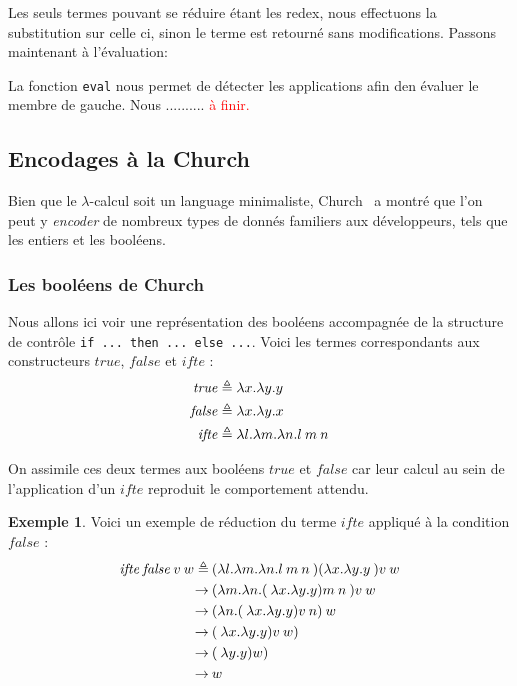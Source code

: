 \documentclass {article}
\newcommand{\codefrom}[3]
           {}
\theoremstyle{definition}
\newtheorem{example}{Exemple}
\theoremstyle{remark}
\newcommand{\todo}[1]{\textcolor{red}{#1}}
\newcommand{\fun}[1]{\lstinline!#1!}
\begin{document}
Les seuls termes pouvant se réduire étant les redex, nous effectuons la substitution sur celle ci,
sinon le terme est retourné sans modifications.
Passons maintenant à l'évaluation:

\codefrom{untyped}{lambda}{evaluation}

La fonction \fun{eval} nous permet de détecter les applications afin den évaluer le membre de gauche.
Nous .......... \todo{à finir.}

\subsection{Encodages à la Church}

Bien que le $\lambda$-calcul soit un language minimaliste, Church~\citet{church:lambda-calcul} a montré que l'on peut
y \emph{encoder} de nombreux types de donnés familiers aux développeurs, tels que
les entiers et les booléens.


\subsubsection{Les booléens de Church}
\label{church-bool}

\newcommand{\True}{\ensuremath{\mathit{true}}}
\newcommand{\False}{\ensuremath{\mathit{false}}}
\newcommand{\Ifte}{\ensuremath{\mathit{ifte}}}

Nous allons ici voir une représentation des booléens accompagnée de la 
structure de contrôle \texttt{if ... then ... else ...}.
Voici les termes correspondants aux constructeurs \True{}, \False{} et 
\Ifte{} :
\begin{align*}
  \True &\triangleq  \Lam{x}{\Lam{y}{\Var{y}}} \\
  \False &\triangleq \Lam{x}{\Lam{y}{\Var{x}}} \\
  \Ifte &\triangleq \Lam{l}{\Lam{m}{\Lam{n}{\App{\Var{l}}{\App{\Var{m}}{\Var{n}}}}}}  \\
\end{align*}

On assimile ces deux termes aux booléens \True{} et \False{} car leur calcul au sein
de l'application d'un \Ifte{} reproduit le comportement attendu.

\begin{example}
  Voici un exemple de réduction du terme \Ifte{} appliqué à la condition \False{} :
  \begin{align*}
    \App{\App{\App{\Ifte}{\False{}}}{\Var{v}}}{\Var{w}}  \triangleq&\: \App{\App{\App{(\Lam{l}{\Lam{m}{\Lam{n}{\App{\App{l}{m}}{n}}}}})({\Lam{x}{\Lam{y}{y}}}}){v}}{w} \\
    \rightarrow &\: \App{\App{({\Lam{m}{\Lam{n}{\App{\App({\Lam{x}{\Lam{y}{y}}}){m}}{n}}}}}){v}}{w} \\
    \rightarrow &\: \App{(\Lam{n}{\App{\App({\Lam{x}{\Lam{y}{y}}}){v}}{n}})}{w} \\
    \rightarrow &\: \App{\App({\Lam{x}{\Lam{y}{y}}}){v}}{w}) \\
    \rightarrow &\: \App({\Lam{y}{y}}){w}) \\
    \rightarrow &\: \Var{w}
  \end{align*}
\end{example}
\end{document}
